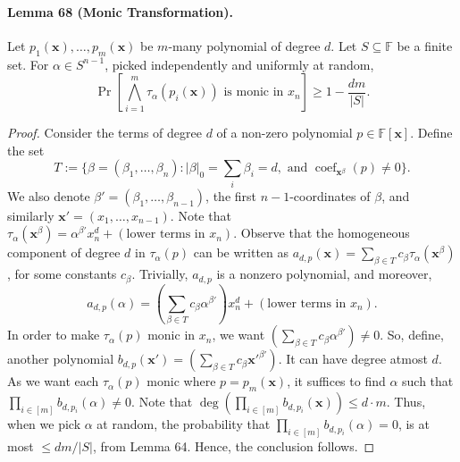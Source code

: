 \paragraph{Lemma 68 (Monic Transformation).} Let $p_1(\mathbf x),\ldots,p_m(\mathbf x)$ be $m$-many polynomial of degree $d$. Let $S\subseteq\mathbb F$ be a finite set. For $\alpha\in S^{n-1}$, picked independently and uniformly at random,
\[\Pr\left[\bigwedge_{i=1}^m\tau_\alpha(p_i(\mathbf x))\text{ is monic in }x_n\right]\ge1-\frac{dm}{|S|}.\]
\begin{proof}Consider the terms of degree $d$ of a non-zero polynomial $p\in\mathbb F[\mathbf x]$. Define the set
\[T:=\{\beta=(\beta_1,\ldots,\beta_n):|\beta|_0=\sum_i\beta_i=d,\text{ and }\operatorname{coef}_{\mathbf x^\beta}(p)\ne0\}.\]
We also denote $\beta'=(\beta_1,\ldots,\beta_{n-1})$, the first $n-1$-coordinates of $\beta$, and similarly $\mathbf x'=(x_1,\ldots,x_{n-1})$. Note that $\tau_\alpha(\mathbf x^\beta)=\alpha^{\beta'}x_n^d+(\text{lower terms in }x_n)$. Observe that the homogeneous component of degree $d$ in $\tau_\alpha(p)$ can be written as $a_{d,p}(\mathbf x)=\sum_{\beta\in T}c_\beta\tau_\alpha(\mathbf x^\beta)$, for some constants $c_\beta$. Trivially, $a_{d,p}$ is a nonzero polynomial, and moreover,
\[a_{d,p}(\alpha)=\left(\sum_{\beta\in T}c_\beta\alpha^{\beta'}\right)x_n^d+(\text{lower terms in }x_n).\]
In order to make $\tau_\alpha(p)$ monic in $x_n$, we want $(\sum_{\beta\in T}c_\beta\alpha^{\beta'})\ne0$. So, define, another polynomial $b_{d,p}(\mathbf x')=(\sum_{\beta\in T}c_\beta\mathbf x'^{\beta'})$. It can have degree atmost $d$. As we want each $\tau_\alpha(p)$ monic where $p=p_m(\mathbf x)$, it suffices to find $\alpha$ such that $\prod_{i\in[m]}b_{d,p_i}(\alpha)\ne0$. Note that $\deg(\prod_{i\in[m]}b_{d,p_i}(\mathbf x))\le d\cdot m$. Thus, when we pick $\alpha$ at random, the probability that $\prod_{i\in[m]}b_{d,p_i}(\alpha)=0$, is at most $\le dm/|S|$, from Lemma 64. Hence, the conclusion follows.\end{proof}
